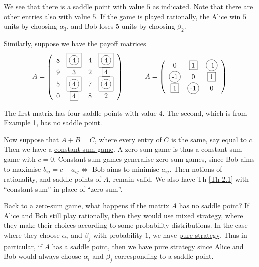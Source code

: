 We see that there is a saddle point with value $5$ as indicated. Note that there are other entries also with value $5$. If the game is played rationally, the Alice win $5$ units by choosing $\alpha_3$, and Bob loses $5$ units by choosing $\beta_2$.

Similarly, suppose we have the payoff matrices
\begin{align}
    A = \left(\begin{array}{cccc}
        8 & \boxed{\circled{4}} & 4 & \boxed{\circled{4}}  \\
        9 & 3 & 2 & \boxed{4}  \\
        5 & \boxed{\circled{4}} & 7 & \boxed{\circled{4}}  \\
        0 & \boxed{4} & 8 & 2  \\
    \end{array} \right) \quad \quad \quad A = \left(\begin{array}{ccc}
        0 & \boxed{1} & \circled{-1}  \\
        \circled{-1} & 0 & \boxed{1}  \\
        \boxed{1} & \circled{-1} & 0  \\
    \end{array} \right) \nonumber
\end{align}

The first matrix has four saddle points with value $4$. The second, which is from Example 1, has no saddle point.

Now suppose that $A+B=C$, where every entry of $C$ is the same, say equal to $c$. Then we have a \uline{constant-sum game}. A zero-sum game is thus a constant-sum game with $c=0$. Constant-sum games generalise zero-sum games, since Bob aims to maximise $b_{ij} = c-a_{ij}\Longleftrightarrow$ Bob aims to minimise $a_{ij}$. Then notions of rationality, and saddle points of $A$, remain valid. We also have Th \ref{Th 2.1} with ``constant-sum'' in place of ``zero-sum''.

Back to a zero-sum game, what happens if the matrix $A$ has no saddle point? If Alice and Bob still play rationally, then they would use \uline{mixed strategy}, where they make their choices according to some probability distributions. In the case where they choose $\alpha_i$ and $\beta_j$ with probability $1$, we have \uline{pure strategy}. Thus in particular, if $A$ has a saddle point, then we have pure strategy since Alice and Bob would always choose $\alpha_i$ and $\beta_j$ corresponding to a saddle point.

